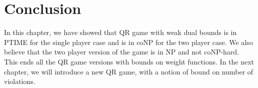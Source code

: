\section{Conclusion}
In this chapter, we have showed that QR game with weak dual bounds is in PTIME for the single player case and is in coNP for the two player case. We also believe that the two player version of the game is in NP and not coNP-hard.\\
This ends all the QR game versions with bounds on weight functions. In the next chapter, we will introduce a new QR game, with a notion of bound on number of violations.